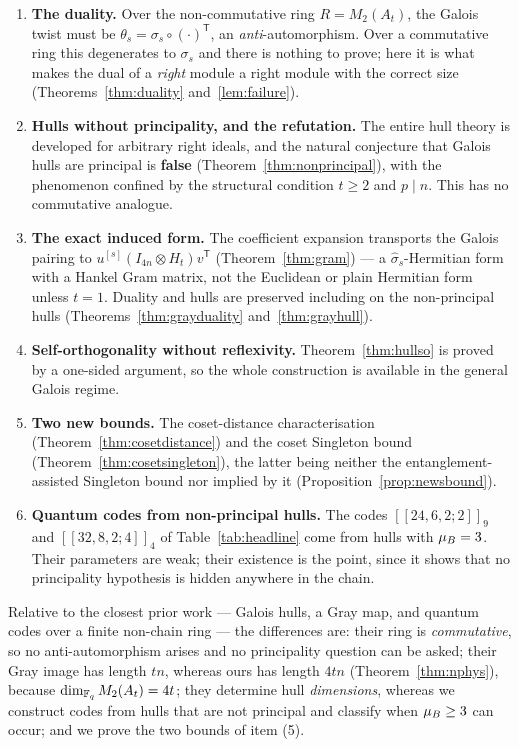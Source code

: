 \begin{enumerate}[label=\textnormal{(\arabic*)},leftmargin=*]
\item \textbf{The duality.} Over the non-commutative ring $R=M_2(A_t)$, the
  Galois twist must be $\theta_s=\sigma_s\circ(\cdot)^{\mathsf T}$, an
  \emph{anti}-automorphism. Over a commutative ring this degenerates to
  $\sigma_s$ and there is nothing to prove; here it is what makes the dual of a
  \emph{right} module a right module with the correct size
  (Theorems~\ref{thm:duality} and~\ref{lem:failure}).
\item \textbf{Hulls without principality, and the refutation.} The entire hull
  theory is developed for arbitrary right ideals, and the natural conjecture
  that Galois hulls are principal is \textbf{false}
  (Theorem~\ref{thm:nonprincipal}), with the phenomenon confined by the
  structural condition $t\ge2$ and $p\mid n$. This has no commutative analogue.
\item \textbf{The exact induced form.} The coefficient expansion transports the
  Galois pairing to $u^{[s]}(I_{4n}\otimes H_t)v^{\mathsf T}$
  (Theorem~\ref{thm:gram}) --- a $\widehat\sigma_s$-Hermitian form with a
  Hankel Gram matrix, not the Euclidean or plain Hermitian form unless $t=1$.
  Duality and hulls are preserved including on the non-principal hulls
  (Theorems~\ref{thm:grayduality} and~\ref{thm:grayhull}).
\item \textbf{Self-orthogonality without reflexivity.}
  Theorem~\ref{thm:hullso} is proved by a one-sided argument, so the whole
  construction is available in the general Galois regime.
\item \textbf{Two new bounds.} The coset-distance characterisation
  (Theorem~\ref{thm:cosetdistance}) and the coset Singleton bound
  (Theorem~\ref{thm:cosetsingleton}), the latter being neither the
  entanglement-assisted Singleton bound nor implied by it
  (Proposition~\ref{prop:newsbound}).
\item \textbf{Quantum codes from non-principal hulls.} The codes
  $[[24,6,2;2]]_9$ and $[[32,8,2;4]]_4$ of Table~\ref{tab:headline} come from
  hulls with $\mu_{B}=3$. Their parameters are weak; their existence is the
  point, since it shows that no principality hypothesis is hidden anywhere in
  the chain.
\end{enumerate}

Relative to the closest prior work \cite{ZhangKongZheng2026QuantumGaloisHulls}
--- Galois hulls, a Gray map, and quantum codes over a finite non-chain ring ---
the differences are: their ring is \emph{commutative}, so no anti-automorphism
arises and no principality question can be asked; their Gray image has length
$tn$, whereas ours has length $4tn$ (Theorem~\ref{thm:nphys}), because
$\dim_{\mathbb F_q}M_2(A_t)=4t$; they determine hull \emph{dimensions}, whereas we
construct codes from hulls that are not principal and classify when
$\mu_{B}\ge3$ can occur; and we prove the two bounds of item (5).

